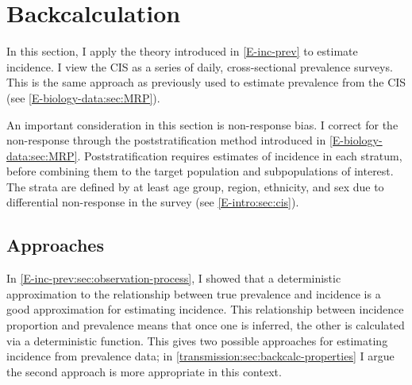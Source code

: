 \documentclass[thesis.tex]{subfiles}
\begin{document}
\section{Backcalculation} \label{backcalc}

In this section, I apply the theory introduced in \cref{E-inc-prev} to estimate incidence.
I view the CIS as a series of daily, cross-sectional prevalence surveys.
This is the same approach as previously used to estimate prevalence from the CIS (see \cref{E-biology-data:sec:MRP}).

An important consideration in this section is non-response bias.
I correct for the non-response through the poststratification method introduced in \cref{E-biology-data:sec:MRP}.
Poststratification requires estimates of incidence in each stratum, before combining them to the target population and subpopulations of interest.
The strata are defined by at least age group, region, ethnicity, and sex due to differential non-response in the survey (see \cref{E-intro:sec:cis}).

\subsection{Approaches} \label{backcalc:sec:approach}

In \cref{E-inc-prev:sec:observation-process}, I showed that a deterministic approximation to the relationship between true prevalence and incidence is a good approximation for estimating incidence.
This relationship between incidence proportion and prevalence means that once one is inferred, the other is calculated via a deterministic function.
This gives two possible approaches for estimating incidence from prevalence data; in \cref{transmission:sec:backcalc-properties} I argue the second approach is more appropriate in this context.

\end{document}
